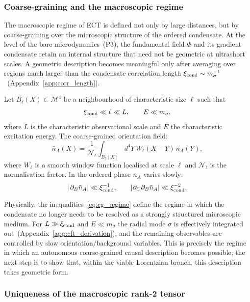 \documentclass[11pt,a4paper]{article}
\numberwithin{equation}{section}
\begin{document}
\subsubsection*{Coarse-graining and the macroscopic regime}

The macroscopic regime of ECT is defined not only by large distances,
but by coarse-graining over the microscopic structure of the ordered
condensate.
At the level of the bare microdynamics~(P3), the fundamental field
$\Phi$ and its gradient condensate retain an internal structure that
need not be geometric at ultrashort scales.
A geometric description becomes meaningful only after averaging over
regions much larger than the condensate correlation length
$\xi_{\rm cond}\sim m_\sigma^{-1}$~(Appendix~\ref{app:corr_length}).

Let $B_\ell(X)\subset\mathcal{M}^4$ be a neighbourhood of
characteristic size $\ell$ such that
\begin{equation}
  \label{eq:cg_regime}
  \xi_{\rm cond}\ll\ell\ll L,
  \qquad
  E\ll m_\sigma,
\end{equation}
where $L$ is the characteristic observational scale and $E$ the
characteristic excitation energy.
The coarse-grained orientation field:
\begin{equation}
  \label{eq:coarse_grained_n}
  \bar{n}_A(X)
  = \frac{1}{\mathcal{N}_\ell}
    \int_{B_\ell(X)}d^4Y\,W_\ell(X-Y)\,n_A(Y),
\end{equation}
where $W_\ell$ is a smooth window function localised at scale $\ell$
and $\mathcal{N}_\ell$ is the normalisation factor.
In the ordered phase $\bar{n}_A$ varies slowly:
\begin{equation}
  \label{eq:slow_orientation}
  |\partial_B\bar{n}_A|\ll\xi_{\rm cond}^{-1},
  \qquad
  |\partial_C\partial_B\bar{n}_A|\ll\xi_{\rm cond}^{-2}.
\end{equation}

Physically, the inequalities~\eqref{eq:cg_regime} define the regime
in which the condensate no longer needs to be resolved as a strongly
structured microscopic medium.
For $L\gg\xi_{\rm cond}$ and $E\ll m_\sigma$ the radial mode $\sigma$
is effectively integrated out~(Appendix~\ref{app:eft_derivation}),
and the remaining observables are controlled by slow orientation/background
variables.
This is precisely the regime in which an autonomous coarse-grained
causal description becomes possible; the next step is to show that,
within the viable Lorentzian branch, this description takes geometric form.

\subsubsection*{Uniqueness of the macroscopic rank-2 tensor}
\end{document}
